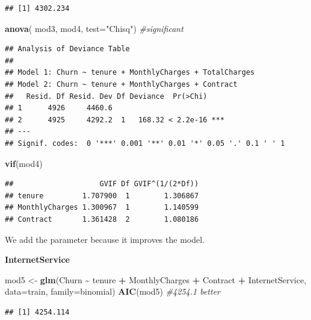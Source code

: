 \documentclass[
  twoside]{article}
\newenvironment{Shaded}{\begin{snugshade}}{\end{snugshade}}
\newcommand{\AttributeTok}[1]{\textcolor[rgb]{0.13,0.29,0.53}{#1}}
\newcommand{\CommentTok}[1]{\textcolor[rgb]{0.56,0.35,0.01}{\textit{#1}}}
\newcommand{\FunctionTok}[1]{\textcolor[rgb]{0.13,0.29,0.53}{\textbf{#1}}}
\newcommand{\NormalTok}[1]{#1}
\newcommand{\OtherTok}[1]{\textcolor[rgb]{0.56,0.35,0.01}{#1}}
\newcommand{\SpecialCharTok}[1]{\textcolor[rgb]{0.81,0.36,0.00}{\textbf{#1}}}
\newcommand{\StringTok}[1]{\textcolor[rgb]{0.31,0.60,0.02}{#1}}
\begin{document}
\begin{verbatim}
## [1] 4302.234
\end{verbatim}

\begin{Shaded}
\begin{Highlighting}[]
\FunctionTok{anova}\NormalTok{( mod3, mod4,  }\AttributeTok{test=}\StringTok{"Chisq"}\NormalTok{) }\CommentTok{\#significant}
\end{Highlighting}
\end{Shaded}

\begin{verbatim}
## Analysis of Deviance Table
## 
## Model 1: Churn ~ tenure + MonthlyCharges + TotalCharges
## Model 2: Churn ~ tenure + MonthlyCharges + Contract
##   Resid. Df Resid. Dev Df Deviance  Pr(>Chi)    
## 1      4926     4460.6                          
## 2      4925     4292.2  1   168.32 < 2.2e-16 ***
## ---
## Signif. codes:  0 '***' 0.001 '**' 0.01 '*' 0.05 '.' 0.1 ' ' 1
\end{verbatim}

\begin{Shaded}
\begin{Highlighting}[]
\FunctionTok{vif}\NormalTok{(mod4)}
\end{Highlighting}
\end{Shaded}

\begin{verbatim}
##                    GVIF Df GVIF^(1/(2*Df))
## tenure         1.707900  1        1.306867
## MonthlyCharges 1.300967  1        1.140599
## Contract       1.361428  2        1.080186
\end{verbatim}

We add the parameter because it improves the model.

\textbf{InternetService}

\begin{Shaded}
\begin{Highlighting}[]
\NormalTok{mod5 }\OtherTok{\textless{}{-}} \FunctionTok{glm}\NormalTok{(Churn }\SpecialCharTok{\textasciitilde{}}\NormalTok{ tenure }\SpecialCharTok{+}\NormalTok{ MonthlyCharges }\SpecialCharTok{+}\NormalTok{ Contract }\SpecialCharTok{+}\NormalTok{ InternetService, }\AttributeTok{data=}\NormalTok{train, }\AttributeTok{family=}\NormalTok{binomial)}
\FunctionTok{AIC}\NormalTok{(mod5) }\CommentTok{\#4254.1 better}
\end{Highlighting}
\end{Shaded}

\begin{verbatim}
## [1] 4254.114
\end{verbatim}
\end{document}
